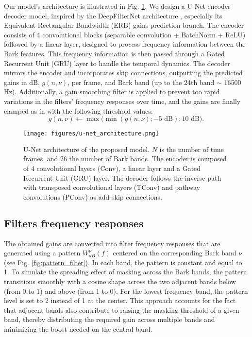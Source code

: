 Our model's architecture is illustrated in Fig. \ref{fig:u-net_architecture}. We design a U-Net encoder-decoder model, inspired by the DeepFilterNet architecture \cite{schroterDeepfilternetLowComplexity2022}, especially its Equivalent Rectangular Bandwidth (ERB) gains prediction branch. The encoder consists of 4 convolutional blocks (separable convolution + BatchNorm + ReLU) followed by a linear layer, designed to process frequency information between the Bark features. 
This frequency information is then passed through a Gated Recurrent Unit (GRU) layer to handle the temporal dynamics. The decoder mirrors the encoder and incorporates skip connections, outputting the predicted gains in dB, $g(n,\nu)$, per frame, and Bark band (up to the 24th band $\sim$ 16500 Hz). 
Additionally, a gain smoothing filter is applied to prevent too rapid variations in the filters' frequency responses over time, and the gains are finally clamped as in \cite{estrederPerceptualAudioEqualization2018} with the following threshold values:
\begin{equation}
    g(n, \nu) \leftarrow \max \big( \min( g(n, \nu); -5 \text{ dB} ) ; 10 \text{ dB} \big).
\end{equation} 
\vspace{-0.5cm}

\begin{figure}
    \centering
    \texttt{[image: figures/u-net\_architecture.png]}
    \caption{U-Net architecture of the proposed model. $N$ is the number of time frames, and 26 the number of Bark bands. The encoder is composed of 4 convolutional layers (Conv), a linear layer and a Gated Recurrent Unit (GRU) layer. The decoder follows the inverse path with transposed convolutional layers (TConv) and pathway convolutions (PConv) as add-skip connections.}%
    \label{fig:u-net_architecture}
\end{figure}

\subsection{Filters frequency responses}

The obtained gains are converted into filter frequency responses
that are generated using a pattern $W_{dB}^\nu(f)$ centered on the corresponding Bark band $\nu$ (see Fig. \ref{fig:pattern_filter}). In each band, the pattern is constant and equal to 1. 
To simulate the spreading effect of masking across the Bark bands, the pattern transitions smoothly with a cosine shape across the two adjacent bands below (from 0 to 1) and above (from 1 to 0). For the lowest frequency band, the pattern level is set to 2 instead of 1 at the center. This approach accounts for the fact that adjacent bands also contribute to raising the masking threshold of a given band, thereby distributing the required gain across multiple bands and minimizing the boost needed on the central band. %

